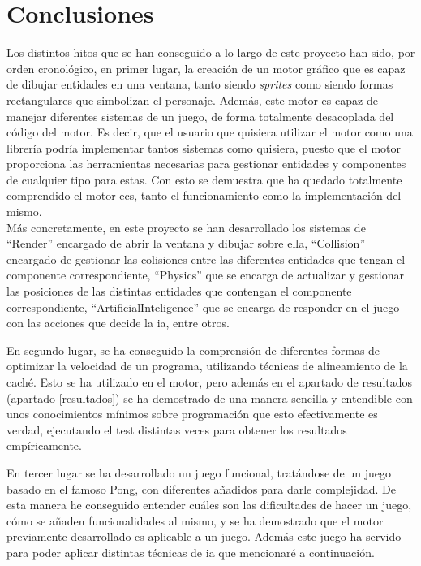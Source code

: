 
\chapter{Conclusiones}
\label{conclusiones}
Los distintos hitos que se han conseguido a lo largo de este proyecto han sido, por orden cronológico, en primer lugar, la creación de un motor gráfico que es capaz de dibujar entidades en una ventana, tanto siendo \textit{sprites} como siendo formas rectangulares que simbolizan el personaje. Además, este motor es capaz de manejar diferentes sistemas de un juego, de forma totalmente desacoplada del código del motor. Es decir, que el usuario que quisiera utilizar el motor como una librería podría implementar tantos sistemas como quisiera, puesto que el motor proporciona las herramientas necesarias para gestionar entidades y componentes de cualquier tipo para estas. Con esto se demuestra que ha quedado totalmente comprendido el motor \gls{ecs}, tanto el funcionamiento como la implementación del mismo. 
\\
Más concretamente, en este proyecto se han desarrollado los sistemas de ``Render'' encargado de abrir la ventana y dibujar sobre ella, ``Collision''  encargado de gestionar las colisiones entre las diferentes entidades que tengan el componente correspondiente, ``Physics'' que se encarga de actualizar y gestionar las posiciones de las distintas entidades que contengan el componente correspondiente, ``ArtificialInteligence'' que se encarga de responder en el juego con las acciones que decide la \gls{ia}, entre otros.

En segundo lugar, se ha conseguido la comprensión de diferentes formas de optimizar la velocidad de un programa, utilizando técnicas de alineamiento de la caché. Esto se ha utilizado en el motor, pero además en el apartado de resultados (apartado \ref{resultados}) se ha demostrado de una manera sencilla y entendible con unos conocimientos mínimos sobre programación que esto efectivamente es verdad, ejecutando el test distintas veces para obtener los resultados empíricamente.

En tercer lugar se ha desarrollado un juego funcional, tratándose de un juego basado en el famoso Pong, con diferentes añadidos para darle complejidad. De esta manera he conseguido entender cuáles son las dificultades de hacer un juego, cómo se añaden funcionalidades al mismo, y se ha demostrado que el motor previamente desarrollado es aplicable a un juego. Además este juego ha servido para poder aplicar distintas técnicas de \gls{ia} que mencionaré a continuación.

